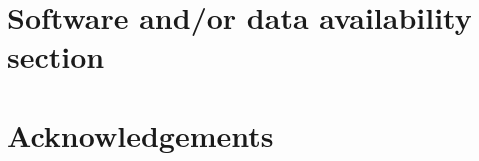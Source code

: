 \section*{Software and/or data availability section}

\section*{Acknowledgements}

\appendix

\printcredits

% 

% 

